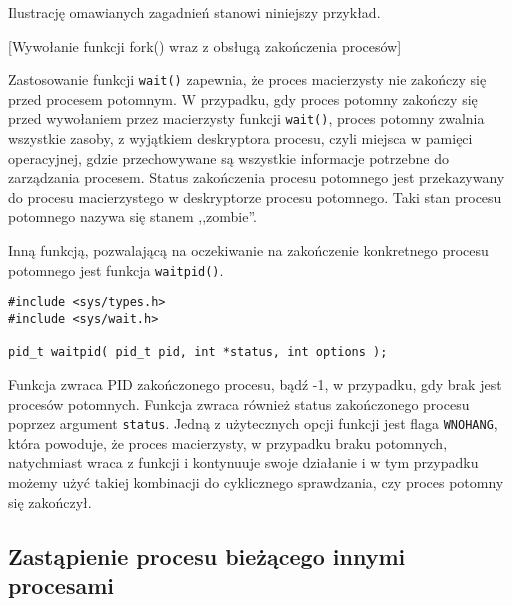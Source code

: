 Ilustrację omawianych zagadnień stanowi niniejszy przykład.

\begin{example}{[Wywołanie funkcji fork() wraz z obsługą zakończenia procesów]}
  \label{ex:11SSB}
  
\end{example}


Zastosowanie funkcji \texttt{wait()} zapewnia, że proces macierzysty nie zakończy się
przed procesem potomnym. W przypadku, gdy proces potomny zakończy się przed
wywołaniem przez macierzysty funkcji \texttt{wait()}, proces potomny zwalnia
wszystkie zasoby, z wyjątkiem deskryptora procesu, czyli miejsca w pamięci
operacyjnej, gdzie przechowywane są wszystkie informacje potrzebne do
zarządzania procesem. Status zakończenia procesu potomnego jest przekazywany do
procesu macierzystego w deskryptorze procesu potomnego. Taki stan procesu
potomnego nazywa się stanem ,,zombie''.

Inną funkcją, pozwalającą na oczekiwanie na zakończenie konkretnego procesu
potomnego jest funkcja \texttt{waitpid()}.

\begin{lstlisting}[style=MyCStyle]
#include <sys/types.h>
#include <sys/wait.h>

pid_t waitpid( pid_t pid, int *status, int options );
\end{lstlisting}

Funkcja zwraca PID zakończonego procesu, bądź -1, w przypadku, gdy brak jest
procesów potomnych. Funkcja zwraca również status zakończonego procesu poprzez
argument \texttt{status}. Jedną z użytecznych opcji funkcji jest flaga
\texttt{WNOHANG}, która powoduje, że proces macierzysty, w przypadku braku
potomnych, natychmiast wraca z funkcji i kontynuuje swoje działanie i w tym
przypadku możemy użyć takiej kombinacji do cyklicznego sprawdzania, czy proces
potomny się zakończył.


\subsection{Zastąpienie procesu bieżącego innymi procesami}


